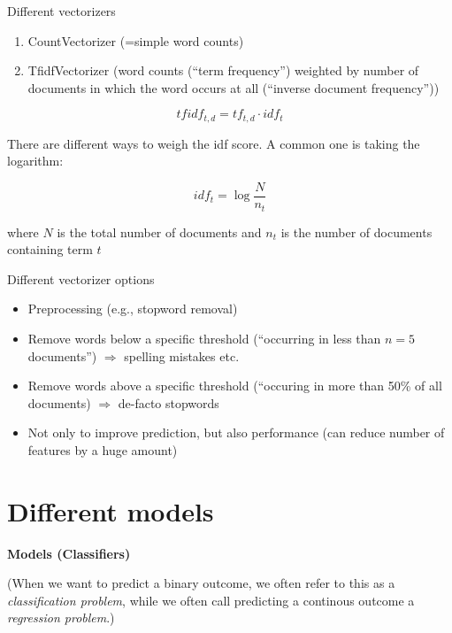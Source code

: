 \documentclass{beamer}
\begin{document}
\begin{frame}{Different vectorizers}
\begin{enumerate}[<+->]
	\item CountVectorizer (=simple word counts)
	\item TfidfVectorizer (word counts (``term frequency'') weighted by number of documents in which the word occurs at all (``inverse document frequency''))
\end{enumerate}

\pause
$$tfidf_{t,d} = tf_{t,d} \cdot idf_{t}$$

There are different ways to weigh the idf score. A common one is taking the logarithm:

$$idf_{t} = \log \frac{N}{n_t}$$

where $N$ is the total number of documents and $n_t$ is the number of documents containing term $t$
\end{frame}

\begin{frame}{Different vectorizer options}
\begin{itemize}
	\item Preprocessing (e.g., stopword removal)
	\item Remove words below a specific threshold (``occurring in less than $n=5$ documents'') $\Rightarrow$ spelling mistakes etc.
	\item Remove words above a specific threshold (``occuring in more than 50\% of all documents) $\Rightarrow$ de-facto stopwords
	\item Not only to improve prediction, but also performance (can reduce number of features by a huge amount)
\end{itemize}
\end{frame}








\section{Different models}


\begin{frame}[plain]
\textbf{Models (Classifiers)}

\vspace{1cm}

\footnotesize{(When we want to predict a binary outcome, we often refer to this as a \emph{classification problem}, while we often call predicting a continous outcome a \emph{regression problem}.)}
\end{frame}
\end{document}
